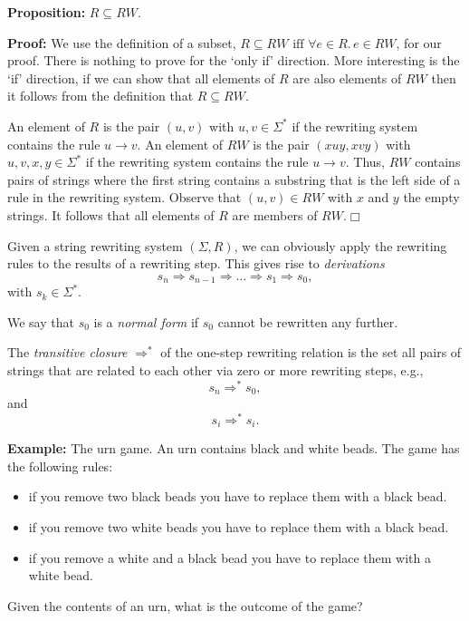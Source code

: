 \documentclass[a4paper,blends,pdf,colorBG,slideColor]{prosper}
\begin{document}

{\bf Proposition:} $R \subseteq RW$.

\vspace{.1in}

{\bf Proof:} We use the definition of a subset, $R \subseteq RW \mbox{ iff } \forall e\in R.\, e\in RW$, for our proof.
There is nothing to prove for the `only if' direction. More interesting is the `if' direction, if we can show that all elements of $R$ are 
also elements of $RW$ then it follows from the definition that $R \subseteq RW$. 

\vspace{.1in}
An element of $R$ is the pair $(u,v)$ with $u,v\in \Sigma^*$ if the rewriting system contains the rule $u\rightarrow v$.
An element of $RW$ is the pair $(xuy,xvy)$ with $u,v,x,y\in \Sigma^*$ if the rewriting system contains the rule
$u \rightarrow v$.  Thus, $RW$ contains pairs of strings where the first string contains a substring that is the left side
of a rule in the rewriting system.  Observe that $(u,v)\in RW$ with $x$ and $y$ the empty strings.  It follows that
all elements of $R$ are members of $RW$.$\Box$


\es


\small
Given a string rewriting system $(\Sigma,R)$, we can obviously apply the rewriting rules to the results of a rewriting step.  This gives
rise to {\em derivations}
\[
s_n \Rightarrow s_{n-1} \Rightarrow\ldots \Rightarrow s_1 \Rightarrow s_0,
\]
with $s_k \in \Sigma^*$.

\vspace{.1in}
We say that $s_0$ is a {\em normal form} if $s_0$ cannot be rewritten any further.

\vspace{.1in}
The {\em transitive closure} $\Rightarrow^*$ of the one-step rewriting relation is the set all pairs of strings that are related
to each other via zero or more rewriting steps, e.g.,
\[
s_n \Rightarrow^* s_0,
\]
and
\[
s_i \Rightarrow^* s_i.
\]

\es


\small

{\bf Example:} The urn game.  An urn contains black and white beads.  The game has the following rules:
{\scriptsize
\begin{itemize}
\item if you remove two black beads you have to replace them with a black bead.
\item if you remove two white beads you have to replace them with a black bead.
\item if you remove a white and a black bead you have to replace them with a white bead.
\end{itemize}
}
Given the contents of an urn, what is the outcome of the game?
\end{document}
